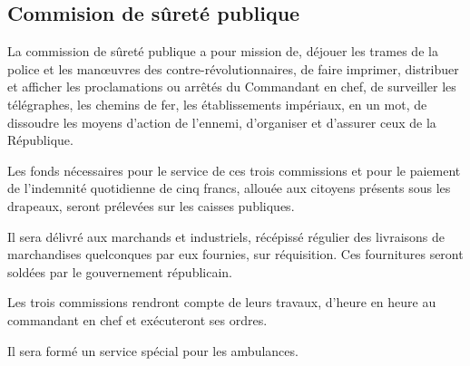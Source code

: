 \documentclass[french,twoside]{book} %
\begin{document}
\subsection[Commision de sûreté publique]{Commision de sûreté publique}
\noindent La commission de sûreté publique a pour mission de, déjouer les trames de la police et les manœuvres des contre-révolutionnaires, de faire imprimer, distribuer et afficher les proclamations ou arrêtés du Commandant en chef, de surveiller les télégraphes, les chemins de fer, les établissements impériaux, en un mot, de dissoudre les moyens d’action de l’ennemi, d’organiser et d’assurer ceux de la République.\par
Les fonds nécessaires pour le service de ces trois commissions et pour le paiement de l’indemnité quotidienne de cinq francs, allouée aux citoyens présents sous les drapeaux, seront prélevées sur les caisses publiques.\par
Il sera délivré aux marchands et industriels, récépissé régulier des livraisons de marchandises quelconques par eux fournies, sur réquisition. Ces fournitures seront soldées par le gouvernement républicain.\par
Les trois commissions rendront compte de leurs travaux, d’heure en heure au commandant en chef et exécuteront ses ordres.\par
Il sera formé un service spécial pour les ambulances.
\end{document}
